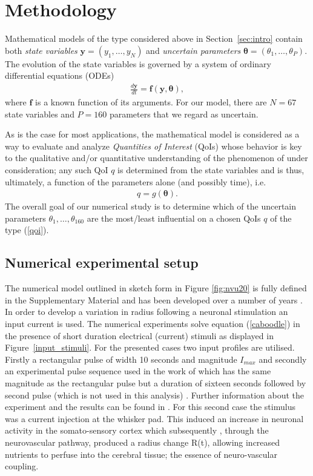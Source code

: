 \section{Methodology}\label{sec:meth}
Mathematical models of the type considered above in Section~\ref{sec:intro} contain both {\sl state variables} $\mathbf y = (y_1, \dots, y_N)$  and {\sl uncertain parameters} $\boldsymbol{\theta} = (\theta_1, \dots, \theta_P)$. The evolution of the state variables is governed by a system of ordinary differential equations (ODEs) 
\begin{eqnarray}
\frac {d\boldsymbol{y}}{dt} = \mathbf{f}(\mathbf{y}, \boldsymbol{\theta}), \label{caboodle}
\end{eqnarray}
where $\mathbf{f}$ is a known function of its arguments. For our model, there are $N = 67$ state variables and $P=160$  parameters that we regard as uncertain. 


As is the case for most applications, the mathematical model is considered as a way to evaluate and analyze {\sl Quantities of Interest} (QoIs) whose behavior is key to the qualitative and/or quantitative understanding of the phenomenon of under consideration; any such QoI $q$ is determined from the state variables and is thus, ultimately, a function of the parameters alone (and possibly time), i.e.
\begin{eqnarray}
q = g(\boldsymbol{\theta}). \label{qoi}
\end{eqnarray}
The overall goal of our numerical study is to determine  which of the uncertain parameters $\theta_1, \dots, \theta_{160}$  are the most/least influential on a chosen QoIs $q$ of the type (\ref{qoi}). 



\subsection{Numerical experimental setup}
The numerical model outlined in sketch form in Figure \ref{fig:nvu20} is fully defined in the Supplementary Material  and has been developed over a number of years \cite{Farr2011,Dormanns2015,Dormanns2016b}. In order to develop a variation in radius following a neuronal stimulation an input current is used. The numerical experiments solve equation (\ref{caboodle}) in the presence of short duration electrical (current) stimuli as displayed in Figure~\ref{input_stimuli}. For the presented cases two input profiles are utilised. Firstly a rectangular pulse of width 10 seconds and magnitude  $I_{max}$ and secondly an experimental pulse sequence used in the work of \cite{Zheng2010} which has the same magnitude as the rectangular pulse but a duration of sixteen seconds followed by second pulse (which is not used in this analysis) . Further information about the experiment and the results can be found in \cite{Zheng2010}.  For this second case the stimulus was a current injection at the whisker pad. This induced an increase in neuronal activity in the somato-sensory cortex which subsequently , through the neurovascular pathway, produced a radius change R(t), allowing increased nutrients to perfuse into the cerebral tissue; the essence of neuro-vascular coupling. 

